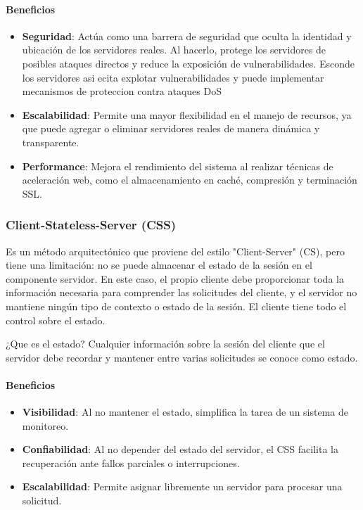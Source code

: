\documentclass{article}
\begin{document}
		\paragraph{Beneficios}
		\begin{itemize}	
			\item {\textbf{Seguridad}}: Actúa como una barrera de seguridad que oculta la identidad y ubicación de los servidores reales. Al hacerlo, protege los servidores de posibles ataques directos y reduce la exposición de vulnerabilidades. Esconde los servidores asi ecita explotar vulnerabilidades y puede implementar mecanismos de proteccion contra ataques DoS
			
			\item {\textbf{Escalabilidad}}: Permite una mayor flexibilidad en el manejo de recursos, ya que puede agregar o eliminar servidores reales de manera dinámica y transparente.
			
			\item {\textbf{Performance}}: Mejora el rendimiento del sistema al realizar técnicas de aceleración web, como el almacenamiento en caché, compresión y terminación SSL.	
			
		\end{itemize}
		
		\subsubsection{Client-Stateless-Server (CSS)}\label{sec:client-statless-server}
		Es un método arquitectónico que proviene del estilo "Client-Server" (CS), pero tiene una limitación: no se puede almacenar el estado de la sesión en el componente servidor. En este caso, el propio cliente debe proporcionar toda la información necesaria para comprender las solicitudes del cliente, y el servidor no mantiene ningún tipo de contexto o estado de la sesión. El cliente tiene todo el control sobre el estado.
		
		¿Que es el estado? Cualquier información sobre la sesión del cliente que el servidor debe recordar y mantener entre varias solicitudes se conoce como estado.
		
		
		\paragraph{Beneficios}
		\begin{itemize}	
			\item {\textbf{Visibilidad}}: Al no mantener el estado, simplifica la tarea de un sistema de monitoreo.
			
			\item {\textbf{Confiabilidad}}: Al no depender del estado del servidor, el CSS facilita la recuperación ante fallos parciales o interrupciones.
			
			\item {\textbf{Escalabilidad}}: Permite asignar libremente un servidor para procesar una solicitud.	
			
		\end{itemize}
		
\end{document}
